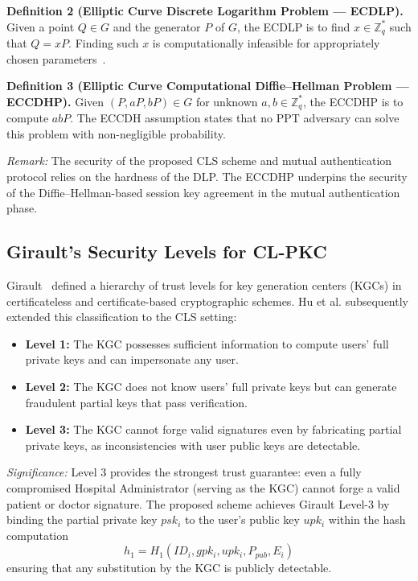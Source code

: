 \documentclass[conference]{IEEEtran}
\begin{document}
\textbf{Definition 2 (Elliptic Curve Discrete Logarithm Problem — ECDLP).} Given a point $Q \in G$ and the generator $P$ of $G$, the ECDLP is to find $x \in \mathbb{Z}_q^*$ such that $Q = xP$. Finding such $x$ is computationally infeasible for appropriately chosen parameters~\cite{ref30}.

\textbf{Definition 3 (Elliptic Curve Computational Diffie--Hellman Problem — ECCDHP).} Given $(P, aP, bP) \in G$ for unknown $a, b \in \mathbb{Z}_q^*$, the ECCDHP is to compute $abP$. The ECCDH assumption states that no PPT adversary can solve this problem with non-negligible probability.

\textit{Remark:} The security of the proposed CLS scheme and mutual authentication protocol relies on the hardness of the DLP. The ECCDHP underpins the security of the Diffie--Hellman-based session key agreement in the mutual authentication phase.

\subsection{Girault's Security Levels for CL-PKC}

Girault~\cite{ref13} defined a hierarchy of trust levels for key generation centers (KGCs) in certificateless and certificate-based cryptographic schemes. Hu et al. subsequently extended this classification to the CLS setting:

\begin{itemize}
\item \textbf{Level 1:} The KGC possesses sufficient information to compute users' full private keys and can impersonate any user.
\item \textbf{Level 2:} The KGC does not know users' full private keys but can generate fraudulent partial keys that pass verification.
\item \textbf{Level 3:} The KGC cannot forge valid signatures even by fabricating partial private keys, as inconsistencies with user public keys are detectable.
\end{itemize}

\textit{Significance:} Level 3 provides the strongest trust guarantee: even a fully compromised Hospital Administrator (serving as the KGC) cannot forge a valid patient or doctor signature. The proposed scheme achieves Girault Level-3 by binding the partial private key $psk_i$ to the user's public key $upk_i$ within the hash computation
\begin{equation}
h_1 = H_1(ID_i, gpk_i, upk_i, P_{pub}, E_i)
\end{equation}
ensuring that any substitution by the KGC is publicly detectable.
\end{document}
